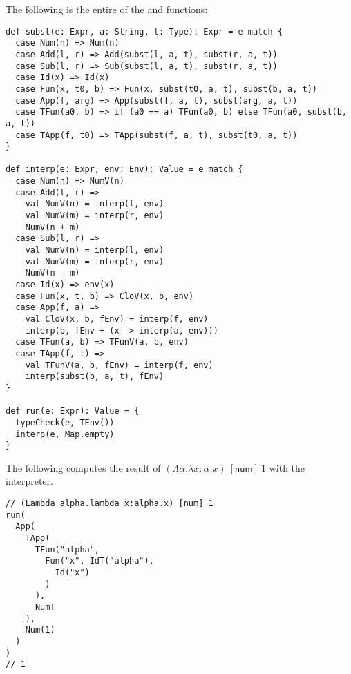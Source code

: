 The following is the entire of the  and  functions:

\begin{verbatim}
def subst(e: Expr, a: String, t: Type): Expr = e match {
  case Num(n) => Num(n)
  case Add(l, r) => Add(subst(l, a, t), subst(r, a, t))
  case Sub(l, r) => Sub(subst(l, a, t), subst(r, a, t))
  case Id(x) => Id(x)
  case Fun(x, t0, b) => Fun(x, subst(t0, a, t), subst(b, a, t))
  case App(f, arg) => App(subst(f, a, t), subst(arg, a, t))
  case TFun(a0, b) => if (a0 == a) TFun(a0, b) else TFun(a0, subst(b, a, t))
  case TApp(f, t0) => TApp(subst(f, a, t), subst(t0, a, t))
}

def interp(e: Expr, env: Env): Value = e match {
  case Num(n) => NumV(n)
  case Add(l, r) =>
    val NumV(n) = interp(l, env)
    val NumV(m) = interp(r, env)
    NumV(n + m)
  case Sub(l, r) =>
    val NumV(n) = interp(l, env)
    val NumV(m) = interp(r, env)
    NumV(n - m)
  case Id(x) => env(x)
  case Fun(x, t, b) => CloV(x, b, env)
  case App(f, a) =>
    val CloV(x, b, fEnv) = interp(f, env)
    interp(b, fEnv + (x -> interp(a, env)))
  case TFun(a, b) => TFunV(a, b, env)
  case TApp(f, t) =>
    val TFunV(a, b, fEnv) = interp(f, env)
    interp(subst(b, a, t), fEnv)
}

def run(e: Expr): Value = {
  typeCheck(e, TEnv())
  interp(e, Map.empty)
}
\end{verbatim}

The following computes the result of \((\Lambda\alpha.\lambda x:\alpha.x)\
[\textsf{num}]\ 1\) with the interpreter.

\begin{verbatim}
// (Lambda alpha.lambda x:alpha.x) [num] 1
run(
  App(
    TApp(
      TFun("alpha",
        Fun("x", IdT("alpha"),
          Id("x")
        )
      ),
      NumT
    ),
    Num(1)
  )
)
// 1
\end{verbatim}

